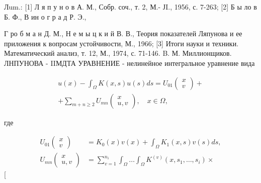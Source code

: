 \documentclass[10pt]{article}
\begin{document}
Лum.: [1] Л я п у н о в А. М., Собр. соч., т. 2, М.- ЈI., 1956, с. 7-263; [2] Б ы ло в Б. Ф., В ин о г р а д Р. Э.,

Г ро б м а н Д. М., Н е м ы ц к и й В. В., Теория показателей Ляпунова и ее приложения к вопросам устойчивости, М., 1966; [3] Итоги науки и техники. Математический анализ, т. 12, М., 1974, с. 71-146. B. М. Миллионщиков. ЛНПУНОВА - IIМДТА УРАВНЕНИЕ - нелинейное интегральное уравнение вида



\[

\begin{gathered}

u(x)-\int_{\Omega} K(x, s) u(s) d s=U_{01}\left(\begin{array}{l}

x \\

v

\end{array}\right)+ \\

+\sum_{m+n \geqslant 2} U_{m n}\left(\begin{array}{c}

x \\

u, v

\end{array}\right), \quad x \in \Omega,

\end{gathered}

\]



где



\[

\begin{aligned}

U_{01}\left(\begin{array}{l}

x \\

v

\end{array}\right) & =K_{0}(x) v(x)+\int_{\Omega} K_{1}(x, s) v(s) d s, \\

U_{m n}\left(\begin{array}{c}

x \\

u, v

\end{array}\right) & =\sum_{v=1}^{n_{i}} \int_{\Omega} \ldots \int_{\Omega} K^{(v)}\left(x, s_{1}, \ldots, s_{i}\right) \times

\end{aligned}

\][
\end{document}
